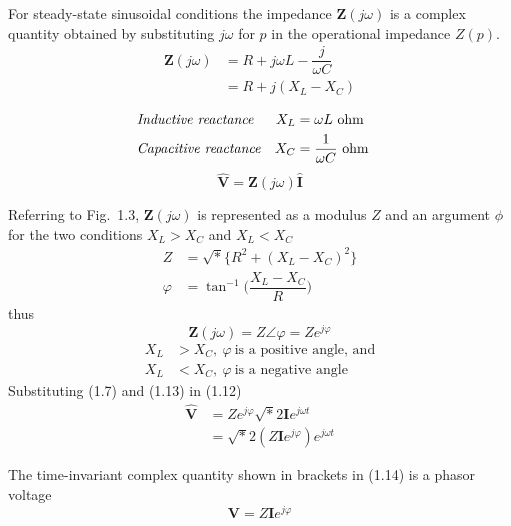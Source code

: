 \documentclass[a4paper,numbers=noenddot,12pt]{scrbook}
\begin{document}
For steady-state sinusoidal conditions the impedance $\mathbf{Z}(j\omega)$ is a complex quantity obtained by substituting $j \omega$ for $p$ in the operational impedance $Z(p)$.
\begin{align}
    \mathbf{Z}(j \omega) & = R + j \omega L - \dfrac{j}{\omega C} \nonumber \\
    & = R + j (X_L - X_C)
    \label{eq:Eq1.11}
\end{align}

\begin{align*}
    &\text{\textit{Inductive reactance}} & X_L & = \omega L \text{\ ohm} && \\
    &\text{\textit{Capacitive reactance}} & X_C &= \dfrac{1}{\omega C} \text{\ ohm}&&
\end{align*}
\begin{equation}
    \mathbf{\hat V} = \mathbf{Z}(j \omega) \mathbf{\hat I}
    \label{eq:Eq1.12}
\end{equation}

Referring to Fig.\ 1.3, $\mathbf{Z}(j \omega)$ is represented as a modulus $Z$ and an argument $\phi$ for the two conditions $X_L > X_C$ and $X_L < X_C$
\begin{align*}
    Z &= \sqrt* \{R^2 + {(X_L - X_C)}^2\} \\
    \varphi & = \tan^{-1} \Big(\dfrac{X_L - X_C}{R}\Big)
\end{align*}
thus
\begin{equation}
    \mathbf{Z}(j \omega) = Z \angle \varphi = Z e^{j \varphi}
    \label{eq:Eq1.13}
\end{equation}
\begin{align*}
    X_L & > X_C,\ \varphi\ \text{is a positive angle, and} \\
    X_L & < X_C,\ \varphi\ \text{is a negative angle}
\end{align*}
Substituting (1.7) and (1.13) in (1.12)
\begin{align}
    \mathbf{\hat V} & = Ze^{j \varphi} \sqrt*{2} \mathbf{I} e^{j \omega t} \nonumber \\
    & = \sqrt*{2} (Z \mathbf{I} e^{j \varphi}) e^{j \omega t}
    \label{eq:Eq1.14}
\end{align}

The time-invariant complex quantity shown in brackets in (1.14) is a phasor voltage
\begin{equation}
    \mathbf{V} = Z \mathbf{I} e^{j\varphi}
    \label{eq:Eq1.15}
\end{equation}
\end{document}
